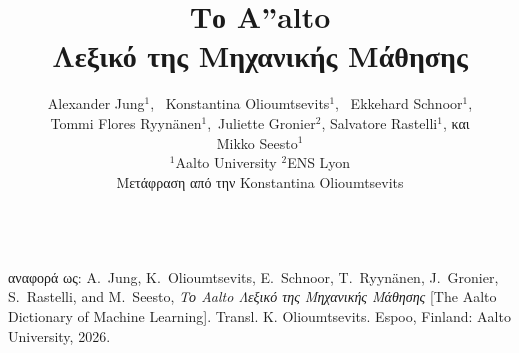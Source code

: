 \documentclass[journal,12pt,onecolumn]{article}
\begin{document}


\title {{\huge {\bf \foreignlanguage{greek}{Το} {\fontsize{40}{48}\selectfont \textbf{\textsf{A\hspace*{-2mm}''}}}\hspace*{-4mm}alto \\ \foreignlanguage{greek}{Λεξικό της Μηχανικής Μάθησης}}}  \\[-5mm] 
}


\author{\hspace{-2mm}Alexander Jung${}^{1}$, \ Konstantina Olioumtsevits${}^{1}$, \ 
	Ekkehard Schnoor${}^{1}$, \\[-2mm] Tommi Flores Ryynänen${}^{1}$,\ 
	Juliette Gronier${}^{2}$, Salvatore Rastelli${}^{1}$, \foreignlanguage{greek}{και} \\[-2mm] Mikko Seesto${}^{1}$ \\[-2mm]
	${}^{1}$Aalto University \quad ${}^{2}$ENS Lyon \\
\hspace{-2mm}\foreignlanguage{greek}{Μετάφραση από την} Konstantina Olioumtsevits \\[-2mm]
}

\maketitle
	\begin{center}
		\\[10mm]
{\large	\foreignlanguage{greek}{αναφορά ως}: A.\ Jung, K.\ Olioumtsevits, E.\ Schnoor, T.\ Ryynänen, J.\ Gronier, S.\ Rastelli, and M.\ Seesto, \textit{\foreignlanguage{greek}{Το} Aalto \foreignlanguage{greek}{Λεξικό της Μηχανικής Μάθησης}} [The Aalto Dictionary of Machine Learning]. Transl. K. Olioumtsevits. Espoo, Finland: Aalto University, 2026.}
\end{center}
\end{document}
